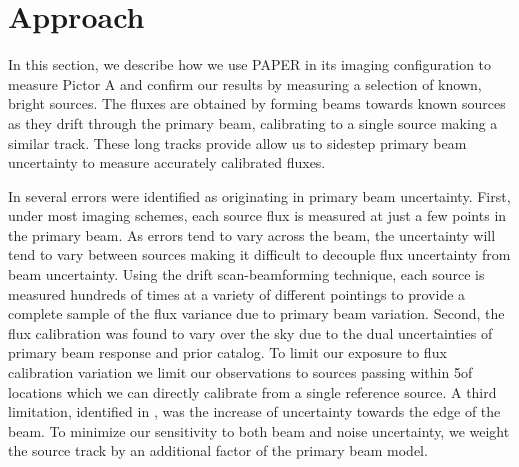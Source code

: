 \documentclass[preprint]{aastex}
\begin{document}
\section{Approach}
\label{sec:approach}
In this section, we describe how we use PAPER in its imaging configuration
to measure Pictor A and confirm our results by measuring a  selection of known, bright sources. The fluxes are obtained
by forming beams towards known sources as they drift through the primary beam, calibrating to a single source making a similar track.
These long tracks provide allow us to sidestep primary beam uncertainty to measure accurately calibrated fluxes.


 In \citet{Jacobs:2013p9837} several errors were identified as originating in primary beam uncertainty.
  First, under most imaging schemes, each source flux is measured at just a few 
points in the primary beam. As errors tend to vary across the beam, the uncertainty will tend to vary between sources making
it difficult to decouple flux uncertainty from beam uncertainty.
 Using the drift scan-beamforming technique, each 
source is measured hundreds of times at a variety of different pointings to provide a complete sample of the
flux variance due to primary beam variation.  Second, the flux calibration was found to vary over the 
sky due to the dual uncertainties of primary beam response and prior catalog. To limit our exposure to flux calibration
variation we limit our observations to sources passing within 5\arcdeg of locations which we can directly calibrate
from a single reference source.
 A third limitation, identified in \citet{Williams:2012p8768},
was the increase of uncertainty towards the edge of the beam. To minimize our sensitivity to both beam and noise
uncertainty, we weight the source track by an additional factor of the primary beam model.  
\end{document}
